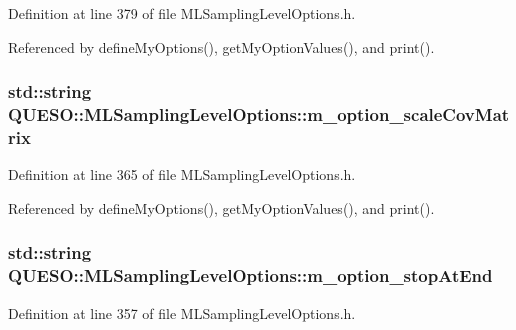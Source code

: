 Definition at line 379 of file M\-L\-Sampling\-Level\-Options.\-h.



Referenced by define\-My\-Options(), get\-My\-Option\-Values(), and print().

\hypertarget{class_q_u_e_s_o_1_1_m_l_sampling_level_options_aa1f82f5b58286f8b2565d80cc33dec4f}{
\subsubsection[{m\-\_\-option\-\_\-scale\-Cov\-Matrix}]{\setlength{\rightskip}{0pt plus 5cm}std\-::string Q\-U\-E\-S\-O\-::\-M\-L\-Sampling\-Level\-Options\-::m\-\_\-option\-\_\-scale\-Cov\-Matrix\hspace{0.3cm}{\ttfamily [private]}}}\label{class_q_u_e_s_o_1_1_m_l_sampling_level_options_aa1f82f5b58286f8b2565d80cc33dec4f}


Definition at line 365 of file M\-L\-Sampling\-Level\-Options.\-h.



Referenced by define\-My\-Options(), get\-My\-Option\-Values(), and print().

\hypertarget{class_q_u_e_s_o_1_1_m_l_sampling_level_options_a3182deb5fada9f8cc55f6335c5a65f46}{
\subsubsection[{m\-\_\-option\-\_\-stop\-At\-End}]{\setlength{\rightskip}{0pt plus 5cm}std\-::string Q\-U\-E\-S\-O\-::\-M\-L\-Sampling\-Level\-Options\-::m\-\_\-option\-\_\-stop\-At\-End\hspace{0.3cm}{\ttfamily [private]}}}\label{class_q_u_e_s_o_1_1_m_l_sampling_level_options_a3182deb5fada9f8cc55f6335c5a65f46}


Definition at line 357 of file M\-L\-Sampling\-Level\-Options.\-h.



